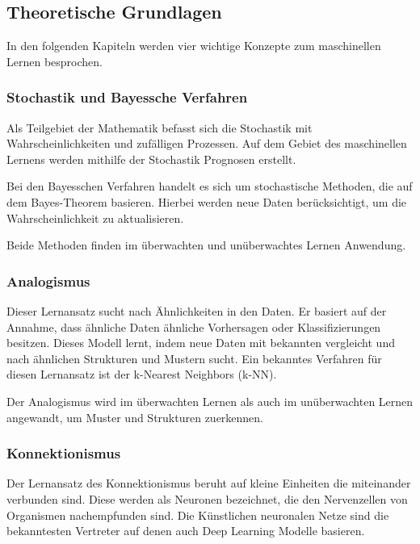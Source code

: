 \subsection{Theoretische Grundlagen}
In den folgenden Kapiteln werden vier wichtige Konzepte zum maschinellen Lernen besprochen. 

\subsubsection{Stochastik und Bayessche Verfahren}
Als Teilgebiet der Mathematik befasst sich die Stochastik mit Wahrscheinlichkeiten und zufälligen Prozessen. Auf dem Gebiet des maschinellen Lernens werden mithilfe der Stochastik Prognosen erstellt.\vspace{0.2cm}

Bei den Bayesschen Verfahren handelt es sich um stochastische Methoden, die auf dem Bayes-Theorem basieren. Hierbei werden neue Daten berücksichtigt, um die Wahrscheinlichkeit zu aktualisieren.\vspace{0.2cm}

Beide Methoden finden im überwachten und unüberwachtes Lernen Anwendung.

\subsubsection{Analogismus}
Dieser Lernansatz sucht nach Ähnlichkeiten in den Daten. Er basiert auf der Annahme, dass ähnliche Daten ähnliche Vorhersagen oder Klassifizierungen besitzen. Dieses Modell lernt, indem neue Daten mit bekannten vergleicht und nach ähnlichen Strukturen und Mustern sucht. Ein bekanntes Verfahren für diesen Lernansatz ist der k-Nearest Neighbors (\acrshort{k-NN}).\vspace{0.2cm}

Der Analogismus wird im überwachten Lernen als auch im unüberwachten Lernen angewandt, um Muster und Strukturen zuerkennen.

\subsubsection{Konnektionismus}
Der Lernansatz des Konnektionismus beruht auf kleine Einheiten die miteinander verbunden sind. Diese werden als Neuronen bezeichnet, die den Nervenzellen von Organismen nachempfunden sind. Die Künstlichen neuronalen Netze sind die bekanntesten Vertreter auf denen auch Deep Learning Modelle basieren.\vspace{0.2cm}

